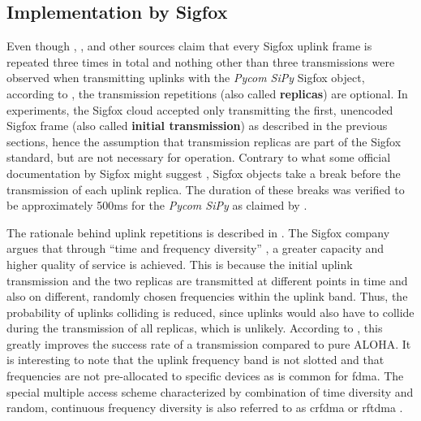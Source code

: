 \subsection{Implementation by Sigfox}
Even though \cite[Section 3.2]{sigfox_tech}, \cite{disk91radioprotocol}, \cite[Section 1.1]{rs_appnote} and other sources claim that every Sigfox uplink frame is repeated three times in total and nothing other than three transmissions were observed when transmitting uplinks with the \textit{Pycom SiPy} Sigfox object, according to \cite[Section 3.2]{stfirmware}, the transmission repetitions (also called \textbf{replicas}) are optional.
In experiments, the Sigfox cloud accepted only transmitting the first, unencoded Sigfox frame (also called \textbf{initial transmission}) as described in the previous sections, hence the assumption that transmission replicas are part of the Sigfox standard, but are not necessary for operation.
Contrary to what some official documentation by Sigfox might suggest \cite[Figure 3]{sigfox_tech}, Sigfox objects take a break before the transmission of each uplink replica.
The duration of these breaks was verified to be approximately 500ms for the \textit{Pycom SiPy} as claimed by \cite[Section 3.2]{stfirmware} \cite[Figure 1-2]{rs_appnote}.

The rationale behind uplink repetitions is described in \cite[Section 3.2 and 4.3]{sigfox_tech}.
The Sigfox company argues that through ``time and frequency diversity'' \cite[Section 3.2]{sigfox_tech}, a greater capacity and higher quality of service is achieved.
This is because the initial uplink transmission and the two replicas are transmitted at different points in time and also on different, randomly chosen frequencies within the uplink band.
Thus, the probability of uplinks colliding is reduced, since uplinks would also have to collide during the transmission of all replicas, which is unlikely.
According to \cite[Figure 9]{sigfox_tech}, this greatly improves the success rate of a transmission compared to pure ALOHA.
It is interesting to note that the uplink frequency band is not slotted \cite[Section 3.2]{phyandmac} and that frequencies are not pre-allocated to specific devices as is common for \gls{fdma}.
The special multiple access scheme characterized by combination of time diversity and random, continuous frequency diversity is also referred to as \gls{crfdma} \cite{crfdma} or \gls{rftdma} \cite{phyandmac}.

